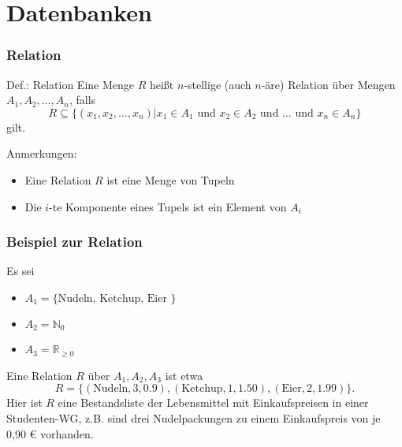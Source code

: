 \section{Datenbanken}
\begin{frame}
\frametitle{Relation}
\begin{block}{Def.: Relation}
Eine Menge $R$ heißt $n$-stellige (auch $n$-äre) Relation über Mengen $A_1,A_2,\ldots,A_n$, falls
\begin{equation*}
R \subseteq \{ (x_1,x_2,\ldots, x_n) | x_1 \in A_1 \text{ und } x_2\in A_2 \text{ und  } \ldots \text{ und } x_n \in A_n \}
\end{equation*}
gilt.
\end{block}
Anmerkungen:\\
\begin{itemize}
\item Eine Relation $R$ ist eine Menge von Tupeln
\item Die $i$-te Komponente eines Tupels ist ein Element von $A_i$
\end{itemize}
\end{frame}
\begin{frame}
\frametitle{Beispiel zur Relation}
Es sei
\begin{itemize}
\item $A_1 = \{ \text{Nudeln, Ketchup, Eier }\}$
\item $A_2 = \mathbb{N}_0$
\item $A_3 = \mathbb{R}_{\geq 0}$
\end{itemize}
\pause
Eine Relation $R$ über $A_1,A_2,A_3$ ist etwa
\begin{equation*}
R = \{(\text{Nudeln}, 3, 0.9),(\text{Ketchup}, 1, 1.50),(\text{Eier}, 2, 1.99) \}.
\end{equation*}
Hier ist $R$ eine Bestandsliste der Lebensmittel mit Einkaufspreisen in einer Studenten-WG, z.B. sind drei Nudelpackungen zu einem Einkaufspreis von je 0,90 € vorhanden.
\end{frame}